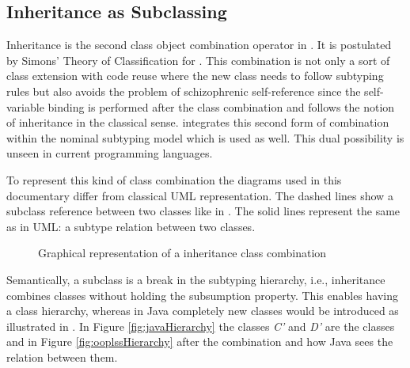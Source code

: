 %
%

\subsection{Inheritance as Subclassing}
Inheritance is the second class object combination operator in
\ooplss. It is postulated by Simons' Theory of Classification for
\cite{simons_theory_2004-2}. This combination is not only a sort of class
extension with code reuse where the new class needs to follow subtyping
rules but also avoids the problem of schizophrenic self-reference since
the self-variable binding is performed after the class combination
and follows the notion of inheritance in the classical sense. \ooplss
integrates this second form of combination within the nominal subtyping
model which is used as well. This dual possibility is unseen in current
programming languages.

To represent this kind of class combination the diagrams used in
this documentary differ from classical UML representation. The
dashed lines show a subclass reference between two classes like in
. The solid lines represent the same as
in UML: a subtype relation between two classes.

\begin{figure}
	\centering
	\caption{Graphical representation of a inheritance class combination}
	\label{fig:subclassCombination}
\end{figure}

Semantically, a subclass is a break in the subtyping hierarchy,
i.e., inheritance combines classes without holding the subsumption
property. This enables \ooplss having a class hierarchy,
whereas in Java completely new classes would be introduced as illustrated
in . In Figure \ref{fig:javaHierarchy} the
classes \emph{C'} and \emph{D'} are the classes \C and \D in Figure
\ref{fig:ooplssHierarchy} after the combination and how Java sees the
relation between them.

